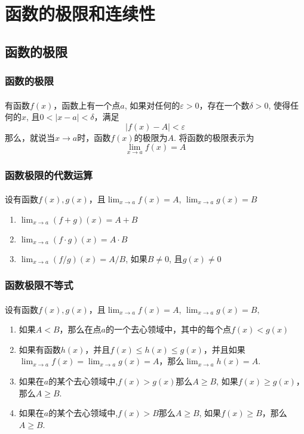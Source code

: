 \section{函数的极限和连续性}
\subsection{函数的极限}

\subsubsection{函数的极限}
\paragraph{}
有函数$f(x)$，函数上有一个点$a$, 如果对任何的$\varepsilon > 0$，存在一个数$\delta > 0$, 使得任何的$x$, 且$0 < |x -a| < \delta$，满足
$$
|f(x) - A| < \varepsilon
$$
那么，就说当$x \to a$时，函数$f(x)$的极限为$A$.  将函数的极限表示为
$$
\lim_{x\to a}f(x) = A
$$

\subsubsection{函数极限的代数运算}
\paragraph{}
设有函数$f(x), g(x)$，且$\lim_{x\to a} f(x) = A$, $\lim_{x\to a} g(x) = B$
\begin{enumerate}
\item $\lim_{x\to a}(f+ g)(x) = A + B$
\item $\lim_{x\to a}(f \cdot g)(x) = A \cdot B$
\item $\lim_{x\to a}(f / g)(x) = A / B$, 如果$B \neq 0$, 且$g(x) \neq 0$
\end{enumerate}

\subsubsection{函数极限不等式}
\paragraph{}
设有函数$f(x), g(x)$，且$\lim_{x\to a} f(x) = A$, $\lim_{x\to a} g(x) = B, $
\begin{enumerate}
\item 如果$A < B$，那么在点$a$的一个去心领域中，其中的每个点$f(x) < g(x)$
\item 如果有函数$h(x)$，并且$f(x) \leq h(x) \leq g(x)$，并且如果$\lim_{x\to a} f(x) = \lim_{x\to a} g(x) = A$，那么$\lim_{x\to a} h(x) = A$.
\item 如果在$a$的某个去心领域中,$f(x) > g(x)$那么$A \geq B$, 如果$f(x) \geq g(x)$，那么$A \geq B$.
\item 如果在$a$的某个去心领域中,$f(x) > B$那么$A \geq B$, 如果$f(x) \geq B$，那么$A \geq B$.

\end{enumerate}


